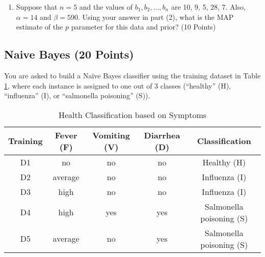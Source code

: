 \documentclass[a3paper,12pt]{article} %
\begin{document}
\begin{enumerate}
    \item Suppose that \( n = 5 \) and the values of \( b_1, b_2, \ldots, b_n \) are 10, 9, 5, 28, 7. Also, \( \alpha = 14 \) and \( \beta = 590 \). Using your answer in part (2), what is the MAP estimate of the \( p \) parameter for this data and prior? (10 Points)
\end{enumerate}

\subsection{Naive Bayes (20 Points)}
You are asked to build a Na\"ive Bayes classifier using the training dataset in Table \ref{tab:training_data}, where each instance is assigned to one out of 3 classes (“healthy” (H), “influenza” (I), or “salmonella poisoning” (S)).

\begin{table}[h]
\centering
\begin{tabular}{|c|c|c|c|c|}
\hline
Training &Fever (F) & Vomiting (V) & Diarrhea (D) & Classification \\
\hline
D1 & no & no & no & Healthy (H) \\
D2 & average & no & no & Influenza (I) \\
D3 & high & no & no & Influenza (I) \\
D4 & high & yes & yes & Salmonella poisoning (S) \\
D5 & average & no & yes & Salmonella poisoning (S) \\
\hline
\end{tabular}
\caption{Health Classification based on Symptoms}
\label{tab:training_data}
\end{table}
\end{document}
